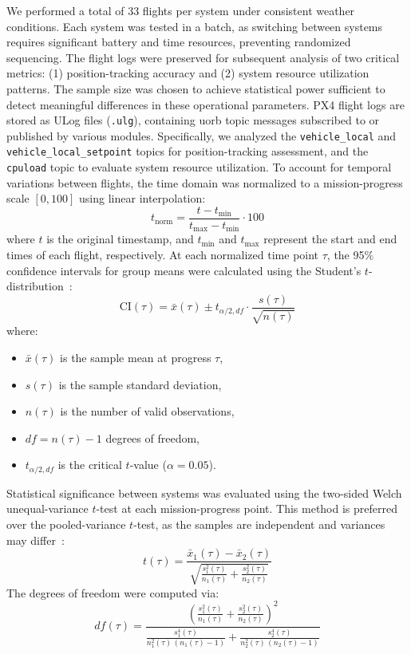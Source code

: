 We performed a total of 33 flights per system under consistent
weather conditions. Each system was tested in a batch, as switching
between systems requires significant battery and time resources, preventing
randomized sequencing.
The flight logs were preserved for subsequent analysis of two critical metrics:
(1) position-tracking accuracy and (2) system resource utilization patterns.
The sample size was chosen to achieve statistical power sufficient to detect meaningful
differences in these operational parameters.
%
PX4 flight logs are stored as ULog files (\lstinline{.ulg}), containing
\gls{uorb} topic messages subscribed to or published by various
modules. Specifically, we analyzed the \lstinline{vehicle_local} and
\lstinline{vehicle_local_setpoint} topics for position-tracking assessment, and
the \lstinline{cpuload} topic to evaluate system resource
utilization.
%
To account for temporal variations between flights, the time domain was
normalized to a mission-progress scale $[0, 100]$ using linear interpolation:
\begin{equation}
t_{\text{norm}} = \frac{t - t_{\min}}{t_{\max} - t_{\min}} \cdot 100
\end{equation}
where $t$ is the original timestamp, and $t_{\min}$ and $t_{\max}$ represent the start and end times of each flight, respectively.
%
At each normalized time point $\tau$, the 95\% confidence intervals for group
means were calculated using the Student's $t$-distribution~\cite{t-test}:
\begin{equation}
\text{CI}(\tau) = \bar{x}(\tau) \pm t_{\alpha/2, df} \cdot \frac{s(\tau)}{\sqrt{n(\tau)}}
\end{equation}
where:
\begin{itemize}
    \item $\bar{x}(\tau)$ is the sample mean at progress $\tau$,
    \item $s(\tau)$ is the sample standard deviation,
    \item $n(\tau)$ is the number of valid observations,
    \item $df = n(\tau) - 1$ degrees of freedom,
    \item $t_{\alpha/2, df}$ is the critical $t$-value ($\alpha = 0.05$).
\end{itemize}

Statistical significance between systems was evaluated using the two-sided
Welch unequal-variance $t$-test at each mission-progress point. This method is
preferred over the pooled-variance $t$-test, as the samples are independent and variances may differ~\cite{welch-t-test}:
\begin{equation}
  \label{eq:welch-t-test}
t(\tau) = \frac{\bar{x}_1(\tau) - \bar{x}_2(\tau)}{\sqrt{\frac{s_1^2(\tau)}{n_1(\tau)} + \frac{s_2^2(\tau)}{n_2(\tau)}}}
\end{equation}
%
The degrees of freedom were computed via:
\begin{equation}
  \label{eq:welch-t-test-df}
df(\tau) = \frac{\left( \frac{s_1^2(\tau)}{n_1(\tau)} + \frac{s_2^2(\tau)}{n_2(\tau)} \right)^2}{\frac{s_1^4(\tau)}{n_1^2(\tau)\,(n_1(\tau)-1)} + \frac{s_2^4(\tau)}{n_2^2(\tau)\,(n_2(\tau)-1)}}
\end{equation}


